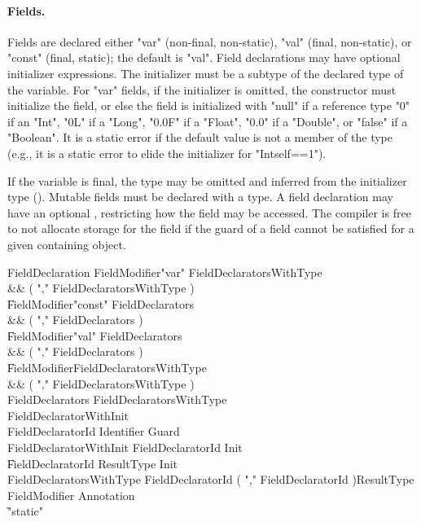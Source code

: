 \paragraph{Fields.}
Fields are declared either \xcd"var" (non-final, non-static),
\xcd"val" (final, non-static), or \xcd"const" (final, static);
the default is \xcd"val".
Field declarations may have optional
initializer expressions.  The initializer must be a subtype of
the declared type of the variable.
For \xcd"var" fields,
if the initializer is omitted, the constructor must initialize
the field, or else the field is initialized with
\xcd"null" if a reference type \xcd"0" if an \xcd"Int", \xcd"0L"
if a \xcd"Long",
\xcd"0.0F" if a \xcd"Float", \xcd"0.0" if a \xcd"Double", or
\xcd"false" if a \xcd"Boolean".  It is a static error if the
default value is not a member of the type (e.g., it is a static
error to elide the initializer for \xcd"Int{self==1}").

If the variable is final,
the type may be omitted and
inferred from the initializer type ().
Mutable fields must be declared with a type.
A field declaration may have an optional
, restricting how the field may be accessed.
The compiler is free to not allocate storage for the field if
the guard of a field cannot be satisfied for a given containing
object.

\begin{grammar}
FieldDeclaration
        \: FieldModifier\star \xcd"var" FieldDeclaratorsWithType \\&& ( \xcd"," FieldDeclaratorsWithType )\star \\
        \| FieldModifier\star \xcd"const" FieldDeclarators \\&& ( \xcd"," FieldDeclarators )\star \\
        \| FieldModifier\star \xcd"val" FieldDeclarators \\&& ( \xcd"," FieldDeclarators )\star \\
        \| FieldModifier\star FieldDeclaratorsWithType \\&& ( \xcd"," FieldDeclaratorsWithType )\star \\
FieldDeclarators
        \: FieldDeclaratorsWithType \\
        \: FieldDeclaratorWithInit \\
FieldDeclaratorId
        \: Identifier Guard\opt \\
FieldDeclaratorWithInit
        \: FieldDeclaratorId Init \\
        \| FieldDeclaratorId ResultType Init \\
FieldDeclaratorsWithType
        \: FieldDeclaratorId ( \xcd"," FieldDeclaratorId )\star ResultType \\
FieldModifier \: Annotation \\
                \| \xcd"static" \\
\end{grammar}

